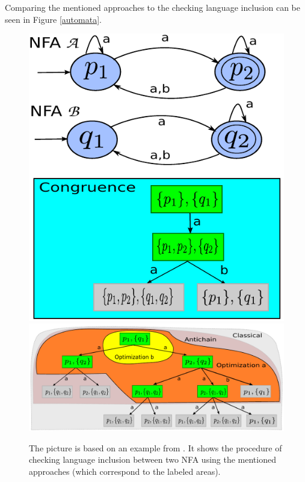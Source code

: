 Comparing the mentioned approaches to the checking language inclusion can be seen in Figure \ref{automata}.
\begin{figure}[bt]
\begin{center}
	\scalebox{1}
	{
		\includegraphics[scale=0.5]{fig/congr1.pdf}
		\hspace{0.55cm}
  	\includegraphics[scale=0.5]{fig/ac1.pdf}
	}
  \caption{
      \rm{
      \hspace{0.1cm} The picture is based on an example from \cite{tacas10}.
      It shows the procedure of checking language inclusion between two NFA using the mentioned approaches (which correspond to the labeled areas).
}}
\end{center}
\end{figure}
